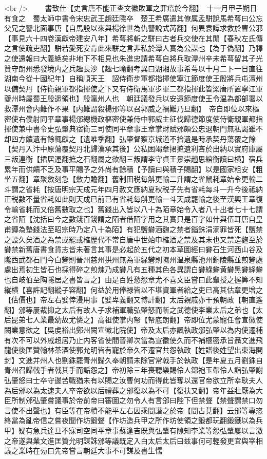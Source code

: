 <br />
　　書致仕【史言唐不能正查文徽敗軍之罪瘖於今翻】　十一月甲子朔日有食之　蜀太師中書令宋忠武王趙廷隱卒　楚王希廣遣其僚属孟駢說馬希萼曰公忘父兄之讐北面事唐【自馬殷以來與楊徐世為仇讐說式芮翻】何異袁譚求救於曹公邪【事見六十四卷漢獻帝建安八年】希萼將斬之駢曰古者兵交使在其閒【春秋左氏傳之言使疏吏翻】駢若愛死安肯此來駢之言非私於潭人實為公謀也【為于偽翻】乃釋之使還報曰大義絶矣非地下不相見也朱進忠請希萼自將兵取潭州辛未希萼留其子光贊守朗州悉發境内之兵趣長沙【趣七喻翻考異曰湖湘故事希萼以十月二卜一日直往湖南今從十國紀年】自稱順天王　詔侍衛步軍都指揮使寧江節度使王殷將兵屯澶州以備契丹【侍衛親軍都指揮使之下又有侍衛馬軍步軍二都指揮此皆梁唐所置寧江軍夔州時屬蜀王殷遥領也】殷瀛州人也　朝廷議發兵以安遠節度使王令温為都部署以救潭州會内難作不果【内難謂殺楊邠等以召郭威之禍難乃旦翻】　帝自即位以來樞密使右僕射同平章事楊邠總機政樞密使兼侍中郭威主征伐歸德節度使侍衛親軍都指揮使兼中書令史弘肇典宿衛三司使同平章事王章掌財賦邠頗公忠退朝門無私謁雖不却四方饋遺有餘輒獻之【遺唯季翻】弘肇督察京城道不拾遺是時承契丹蕩覆之餘【契丹入汴中原蕩覆契丹北歸漢承其後】公私困竭章捃摭遺利吝於出納以實府庫屬三叛連衡【捃居運翻摭之石翻屬之欲翻三叛謂李守貞王景崇趙思綰衡讀曰横】宿兵累年而供饋不乏及事平賜予之外尚有餘積【予讀曰與積子賜翻】以是國家粗安【粗坐五翻】章聚斂刻急【斂力贍翻】舊制田税每斛更輸二升謂之雀鼠耗章始令更輸二斗謂之省耗【按唐明宗天成元年四月赦文應納夏秋税子先有省耗每斗一升今後祗納正税數不量省耗如此則天成已前已有省耗每斛更輸一斗天成罷輸之後至漢興王章復令輸省耗而又倍舊數取之也】舊錢出入皆以八十為陌章始令入者八十出者七十七謂之省陌【沈括曰今之數錢百錢謂之陌者借陌字用之其實只是百字如什與伍耳唐自皇甫鏄為墊錢法至昭宗時乃定八十為陌】有犯鹽礬酒麴之禁者錙銖涓滴罪皆死【鹽禁之設久矣酒之為禁或罷或榷歷代不常自唐中世始申榷酒之禁及其末也又禁造麴至於礬禁新舊唐書食貨志皆未著言其事是必起於五代之初本草圖經曰礬石生河西山谷及隴西武都石門今白礬則晉州慈州拱州無為軍緑礬則隰州温泉縣池州銅陵縣並煎礬處處出焉初生皆石也採得碎之煎煉乃成礬凡有五種其色各異謂白礬綠礬黄礬黑礬絳礬也自岐伯至陶隱居之書皆言之】由是百姓愁怨章尤不喜文臣嘗曰此輩授之握筭不知縱横【喜許記翻縱子容翻】何益於用俸禄皆以不堪資軍者給之吏已高其估章更增之【估價也】帝左右嬖倖浸用事【嬖卑義翻又博計翻】太后親戚亦干預朝政【朝直遙翻】邠等屢裁抑之太后有故人子求補軍職弘肇怒而斬之武德使李業太后之弟也【太后昆弟七人業最幼故尤憐之】高祖使掌内帑【帑底朗翻】帝即位尤蒙寵任會宣徽使闕業意欲之【吳䖍裕出鄭州闕宣徽北院使】帝及太后亦諷執政邠弘肇以為内使遷補有次不可以外戚超居乃止内客省使閻晉卿次當為宣徽使久而不補樞密承旨聶文進飛龍使後匡贊翰林茶酒使郭允明皆有寵於帝久不遷官共怨執政【姓譜後姓望出東海開封】文進并州人也劉銖罷青州歸久奉朝請未除官常戟手於執政【是年夏五月劉銖自青州召歸戟手者戟其手而詬怨之】帝初除三年喪聽樂賜伶人錦袍玉帶伶人詣弘肇謝弘肇怒曰士卒守邊苦戰猶未有以賜之汝曹何功而得此皆奪以還官帝欲立所幸耿夫人為后邠以為太速夫人卒帝欲以后禮葬之邠復以為不可【復扶又翻】帝年益壯厭為大臣所制邠弘肇嘗議事於帝前帝曰審圖之勿令人有言邠曰陛下但禁聲【禁聲謂禁口勿言使不出聲也】有臣等在帝積不能平左右因乘間譛之於帝【間古莧翻】云邠等專恣終當為亂帝信之嘗夜聞作坊鍛聲【作坊造兵甲之所作坊使領之鍛都玩翻鍛鐵以為兵甲】疑有急兵達旦不寐司空同平章事蘇逢吉既與弘肇有隙知李業等怨弘肇屢以言激之帝遂與業文進匡贊允明謀誅邠等議既定入白太后太后曰兹事何可輕發更宜與宰相議之業時在㫄曰先帝嘗言朝廷大事不可謀及書生懦
